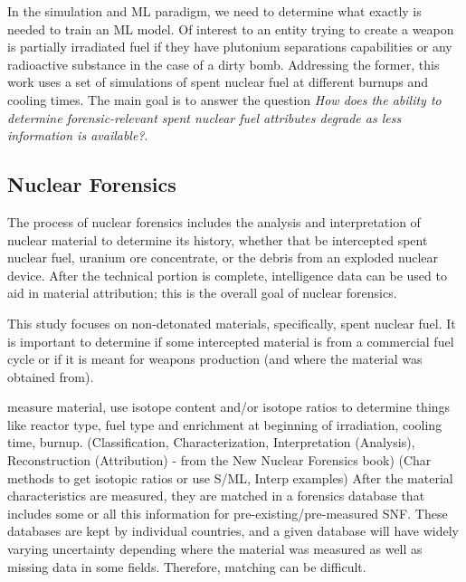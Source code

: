 \documentclass{anstrans}
\begin{document}
In the simulation and \gls{ML} paradigm, we need to determine what exactly is
needed to train an \gls{ML} model.  Of interest to an entity trying to create a
weapon is partially irradiated fuel if they have plutonium separations
capabilities or any radioactive substance in the case of a dirty bomb.
Addressing the former, this work uses a set of simulations of spent nuclear
fuel at different burnups and cooling times. The main goal is to answer the
question \textit{How does the ability to determine forensic-relevant spent
nuclear fuel attributes degrade as less information is available?}. 

\subsection{Nuclear Forensics}

The process of nuclear forensics includes the analysis and interpretation of
nuclear material to determine its history, whether that be intercepted spent
nuclear fuel, uranium ore concentrate, or the debris from an exploded nuclear
device. After the technical portion is complete, intelligence data can be used
to aid in material attribution; this is the overall goal of nuclear forensics. 

This study focuses on non-detonated materials, specifically, spent nuclear
fuel. It is important to determine if some intercepted material is from a
commercial fuel cycle or if it is meant for weapons production (and where the
material was obtained from). 

measure material, use
isotope content and/or isotope ratios to determine things like reactor type,
fuel type and enrichment at beginning of irradiation, cooling time, burnup.
(Classification, Characterization, Interpretation (Analysis), Reconstruction
(Attribution) - from the New Nuclear Forensics book) (Char methods to get
isotopic ratios or use S/ML, Interp examples) After the material
characteristics are measured, they are matched in a forensics database that
includes some or all this information for pre-existing/pre-measured SNF. These
databases are kept by individual countries, and a given database will have
widely varying uncertainty depending where the material was measured as well as
missing data in some fields.  Therefore, matching can be difficult.
\end{document}
